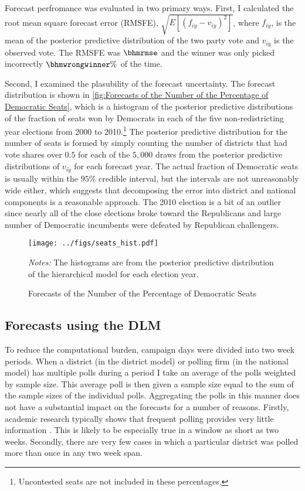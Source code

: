\documentclass[12pt,final,fleqn]{article}
\theoremstyle{plain}
\begin{document}
Forecast perfromance was evaluated in two primary ways.  First, I calculated the root mean square forecast error (RMSFE), $\sqrt{E[(f_{iy} - v_{iy})^2]}$, where $f_{iy}$, is the mean of the posterior predictive distribution of the two party vote and $v_{iy}$ is the observed vote. The RMSFE was $\bhmrmse$ and the winner was only picked incorrectly $\bhmwrongwinner\%$ of the time. 

Second, I examined the plasubility of the forecast uncertainty. The forecast distribution is shown in \autoref{fig:Forecasts of the Number of the Percentage of Democratic Seats}, which is a histogram of the posterior predictive distributions of the fraction of seats won by Democrats in each of the five non-redistricting year elections from 2000 to 2010.\footnote{Uncontested seats are not included in these percentages.} The posterior predictive distribution for the number of seats is formed by simply counting the number of districts that had vote shares over $0.5$ for each of the $5,000$ draws from the posterior predictive distributions of $v_{i\tilde{y}}$ for each forecast year. The actual fraction of Democratic seats is usually within the $95\%$ credible interval, but the intervals are not unreasonably wide either, which suggests that decomposing the error into district and national components is a reasonable approach. The 2010 election is a bit of an outlier since nearly all of the close elections broke toward the Republicans and large number of Democratic incumbents were defeated by Republican challengers. 

\begin{figure}[!htb]
\centering
\texttt{[image: ../figs/seats\_hist.pdf]}
\vspace{.5cm}
\caption{Forecasts of the Number of the Percentage of Democratic Seats}
\label{fig:Forecasts of the Number of the Percentage of Democratic Seats}
\begin{minipage}{\linewidth}
\footnotesize
\emph{Notes:} The histograms are from the posterior predictive distribution of the hierarchical model for each election year.
\end{minipage}
\end{figure}

\subsection{Forecasts using the DLM} \label{sec: Results from the DLM}
To reduce the computational burden, campaign days were divided into two week periods. When a district (in the district model) or polling firm (in the national model) has multiple polls during a period I take an average of the polls weighted by sample size. This average poll is then given a sample size equal to the sum of the sample sizes of the individual polls. Aggregating the polls in this manner does not have a substantial impact on the forecasts for a number of reasons. Firstly, academic research typically shows that frequent polling provides very little information \citep[e.g.][]{gelman1993american, lock2010bayesian}. This is likely to be especially true in a window as short as two weeks. Secondly, there are very few cases in which a particular district was polled more than once in any two week span. 
\end{document}
